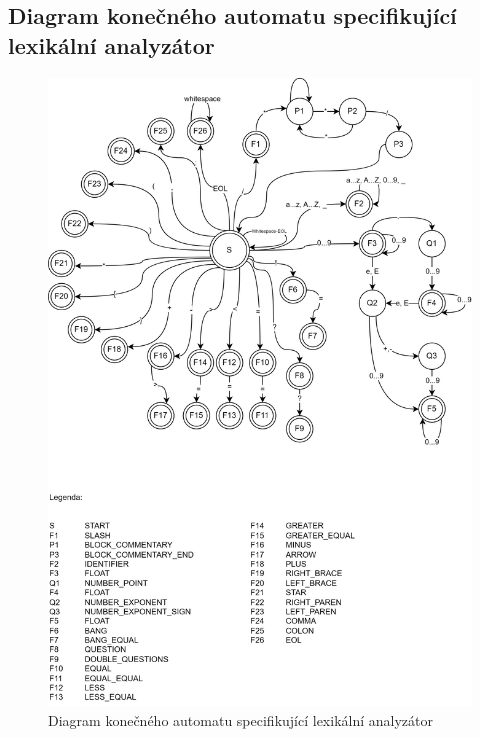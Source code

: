 \documentclass[a4paper, 11pt]{article}
\begin{document}
	\subsection{Diagram konečného automatu specifikující lexikální analyzátor}
	\begin{figure}[!ht]
		\centering
		\vspace{-1.2cm}
		\includegraphics[width=0.95\linewidth]{DIAGRAM.png}
		\caption{Diagram konečného automatu specifikující lexikální analyzátor}
		\label{figure:fa_graph}
	\end{figure}
\end{document}
